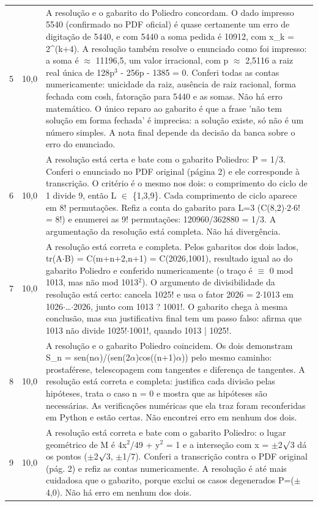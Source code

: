 \documentclass{article}%
\begin{document}
\begin{longtable}{@{}c c p{}@{}}
5 & 10,0 & A resolução e o gabarito do Poliedro concordam. O dado impresso 5540 (confirmado no PDF oficial) é quase certamente um erro de digitação de 5440, e com 5440 a soma pedida é 10912, com x\_k = 2\^{}(k+4). A resolução também resolve o enunciado como foi impresso: a soma é $\approx$ 11196,5, um valor irracional, com p $\approx$ 2,5116 a raiz real única de 128p$^3$ - 256p - 1385 = 0. Conferi todas as contas numericamente: unicidade da raiz, ausência de raiz racional, forma fechada com cosh, fatoração para 5440 e as somas. Não há erro matemático. O único reparo ao gabarito é que a frase 'não tem solução em forma fechada' é imprecisa: a solução existe, só não é um número simples. A nota final depende da decisão da banca sobre o erro do enunciado. \\
6 & 10,0 & A resolução está certa e bate com o gabarito Poliedro: P = 1/3. Conferi o enunciado no PDF original (página 2) e ele corresponde à transcrição. O critério é o mesmo nos dois: o comprimento do ciclo de 1 divide 9, então L $\in$ \{1,3,9\}. Cada comprimento de ciclo aparece em 8! permutações. Refiz a conta do gabarito para L=3 (C(8,2)$\cdot$2$\cdot$6! = 8!) e enumerei as 9! permutações: 120960/362880 = 1/3. A argumentação da resolução está completa. Não há divergência. \\
7 & 10,0 & A resolução está correta e completa. Pelos gabaritos dos dois lados, tr(A$\cdot$B) = C(m+n+2,n+1) = C(2026,1001), resultado igual ao do gabarito Poliedro e conferido numericamente (o traço é $\equiv$ 0 mod 1013, mas não mod 1013$^2$). O argumento de divisibilidade da resolução está certo: cancela 1025! e usa o fator 2026 = 2$\cdot$1013 em 1026$\cdot$\ldots{}$\cdot$2026, junto com 1013 ? 1001!. O gabarito chega à mesma conclusão, mas sua justificativa final tem um passo falso: afirma que 1013 não divide 1025!$\cdot$1001!, quando 1013 | 1025!. \\
8 & 10,0 & A resolução e o gabarito Poliedro coincidem. Os dois demonstram S\_n = sen(n$\alpha$)/(sen(2$\alpha$)cos((n+1)$\alpha$)) pelo mesmo caminho: prostaférese, telescopagem com tangentes e diferença de tangentes. A resolução está correta e completa: justifica cada divisão pelas hipóteses, trata o caso n = 0 e mostra que as hipóteses são necessárias. As verificações numéricas que ela traz foram reconferidas em Python e estão certas. Não encontrei erro em nenhum dos dois. \\
9 & 10,0 & A resolução está correta e bate com o gabarito Poliedro: o lugar geométrico de M é 4x$^2$/49 + y$^2$ = 1 e a interseção com x = $\pm$2$\surd$3 dá os pontos ($\pm$2$\surd$3, $\pm$1/7). Conferi a transcrição contra o PDF original (pág. 2) e refiz as contas numericamente. A resolução é até mais cuidadosa que o gabarito, porque exclui os casos degenerados P=($\pm$4,0). Não há erro em nenhum dos dois. \\

\end{longtable}
\end{document}
